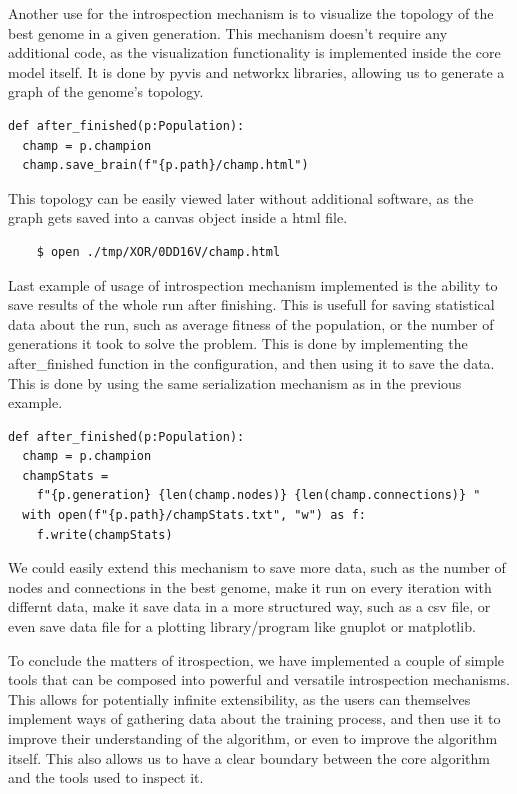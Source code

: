 \documentclass{article}
\begin{document}
    \par Another use for the introspection mechanism is to visualize the topology of the best genome in a given generation.
    This mechanism doesn't require any additional code, as the visualization functionality is implemented inside the
    core model itself. It is done by pyvis and networkx libraries,
    allowing us to generate a graph of the genome's topology.
    \begin{verbatim}
def after_finished(p:Population):
  champ = p.champion
  champ.save_brain(f"{p.path}/champ.html")
    \end{verbatim}
    This topology can be easily viewed later without additional software, as the graph gets saved into a canvas
    object inside a html file.
    \begin{verbatim}
    $ open ./tmp/XOR/0DD16V/champ.html
    \end{verbatim}
    \par Last example of usage of introspection mechanism implemented is the ability to save results of the whole run
    after finishing. This is usefull for saving statistical data about the run, such as average fitness of the population,
    or the number of generations it took to solve the problem. This is done by implementing the after\_finished function
    in the configuration, and then using it to save the data. This is done by using the same serialization mechanism
    as in the previous example. 
\begin{verbatim}
def after_finished(p:Population):
  champ = p.champion
  champStats =
    f"{p.generation} {len(champ.nodes)} {len(champ.connections)} "
  with open(f"{p.path}/champStats.txt", "w") as f:
    f.write(champStats)
\end{verbatim}
    \par We could easily extend this mechanism to save more data, such as the number of nodes
    and connections in the best genome, make it run on every iteration with differnt data,
    make it save data in a more structured way, such as a csv file,
    or even save data file for a plotting library/program like gnuplot or matplotlib.
    \par To conclude the matters of itrospection, we have implemented a couple of
    simple tools that can be composed into powerful and versatile introspection mechanisms.
    This allows for potentially infinite extensibility, as the users can themselves implement 
    ways of gathering data about the training process, and then use it to improve
    their understanding of the algorithm, or even to improve the algorithm itself.
    This also allows us to have a clear boundary between the core algorithm and the tools
    used to inspect it.
\end{document}
